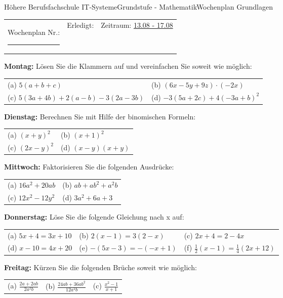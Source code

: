 \documentclass[oneside,openany,headings=optiontotoc,11pt,numbers=noenddot]{scrreprt}
\begin{document}
	\begin{worksheet}{Höhere Berufsfachschule IT-Systeme}{Grundstufe - Mathematik}{Wochenplan Grundlagen}
		\noindent
		\begin{tabularx}{\textwidth}{XXl}
			Wochenplan Nr.: \rule{0.15\textwidth}{1pt} & Erledigt: & Zeitraum: \underline{13.08 - 17.08}
		\end{tabularx}
	
		\begin{framed}
			\noindent
			\textbf{Montag:} Lösen Sie die Klammern auf und vereinfachen Sie soweit wie möglich:\\
			\begin{tabularx}{\textwidth}{XX}
				(a) \(5(a+b+c)\) & (b) \((6x-5y+9z)\cdot{}(-2x)\)\\
				(c) \(5(3a+4b)+2(a-b)-3(2a-3b)\) & (d) \(-3(5a+2c) + 4(-3a+b)^2\)
			\end{tabularx}
		\end{framed}
		\begin{framed}
			\noindent
			\textbf{Dienstag:} Berechnen Sie mit Hilfe der binomischen Formeln:\\
			\begin{tabularx}{\textwidth}{XX}
				(a) \((x+y)^2\) & (b) \((x+1)^2\)\\
				(c) \((2x-y)^2\) & (d) \((x-y)(x+y)\)
			\end{tabularx}
		\end{framed}
		\begin{framed}
			\noindent
			\textbf{Mittwoch:} Faktorisieren Sie die folgenden Ausdrücke:\\
			\begin{tabularx}{\textwidth}{XX}
				(a) \(16a^2 +20ab\) & (b) \(ab +ab^2+a^2b\)\\
				(c) \(12x^2-12y^2\) & (d) \(3a^2+6a+3\)
			\end{tabularx}
		\end{framed}
		\begin{framed}
			\noindent
			\textbf{Donnerstag:} Löse Sie die folgende Gleichung nach x auf:\\
			\begin{tabularx}{\textwidth}{XXX}
				(a) \(5x+4=3x+10\) & (b) \(2(x-1)=3(2-x)\) & (c) \(2x+4 = 2-4x\)\\
				(d) \(x-10 = 4x+20\) & (e) \(-(5x-3) =-(-x+1)\) & (f) \(\frac{1}{2}(x-1) = \frac{1}{4}(2x+12)\)
			\end{tabularx}
		\end{framed}
		\begin{framed}
			\noindent
			\textbf{Freitag:} Kürzen Sie die folgenden Brüche soweit wie möglich:\\
			\begin{tabularx}{\textwidth}{XXX}
				(a) \(\frac{2a+2ab}{2a^2b}\) & (b) \(\frac{24ab + 36ab^2}{12a^2b}\) & (c) \(\frac{x^2-1}{x+1}\)
			\end{tabularx}
		\end{framed}
	\end{worksheet}
\end{document}
